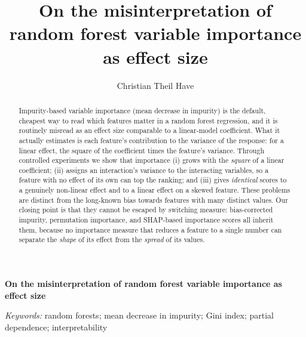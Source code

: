 \documentclass[12pt]{article}
\begin{document}
\def\spacingset#1{\renewcommand{\baselinestretch}%
{#1}\small\normalsize} \spacingset{1}


\anon
{
  \title{On the misinterpretation of random forest variable importance as effect size}
  \author{Christian Theil Have}
  \maketitle
} \fi

\anon
{
  \bigskip
  \bigskip
  \bigskip
  \begin{center}
    {\LARGE\bf On the misinterpretation of random forest variable importance as effect size}
\end{center}
  \medskip
} \fi

\bigskip
\begin{abstract}
Impurity-based variable importance (mean decrease in impurity) is the default,
cheapest way to read which features matter in a random forest regression, and it
is routinely misread as an effect size comparable to a linear-model coefficient.
What it actually estimates is each feature's contribution to the variance of the
response: for a linear effect, the square of the coefficient times the feature's
variance. Through controlled experiments we show that importance (i) grows with
the \emph{square} of a linear coefficient; (ii) assigns an interaction's
variance to the interacting variables, so a feature with no effect of its own
can top the ranking; and (iii) gives \emph{identical} scores to a genuinely
non-linear effect and to a linear effect on a skewed feature. These problems are
distinct from the long-known bias towards features with many distinct values.
Our closing point is that they cannot be escaped by switching measure:
bias-corrected impurity, permutation importance, and SHAP-based importance
scores all inherit them, because no importance measure that reduces a feature to
a single number can separate the \emph{shape} of its effect from the
\emph{spread} of its values.
\end{abstract}

\noindent%
{\it Keywords:} random forests; mean decrease in impurity; Gini index;
partial dependence; interpretability
\vfill

\newpage
\spacingset{1.8} %








\end{document}
